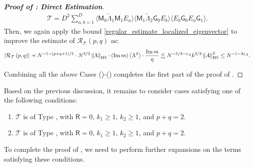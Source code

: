 \documentclass[10pt,reqno]{amsart}
\numberwithin{equation}{section}
\numberwithin{figure}{section}
\newcommand{\rmnum}[1]{\uppercase\expandafter{\romannumeral #1}}
\theoremstyle{plain} %
\theoremstyle{definition} %
\newcommand{\wt}{\widetilde}
\renewcommand{\txt}[1]{\text{\rm{#1}}}
\newcommand{\cT}{\mathcal T}
\newcommand{\cR}{{\mathcal R}}
\newcommand{\sG}{\mathsf G}
\newcommand{\sM}{\mathsf M}
\newcommand{\sR}{\mathsf R}
\renewcommand{\leq}{\le}
\renewcommand{\geq}{\ge}
\newcommand{\pa}[1]{\left({#1}\right)}
\newcommand{\absa}[1]{\left\lvert #1 \right\rvert}
\newcommand{\norma}[1]{\left\lVert #1 \right\rVert}
\newcommand{\avg}[1]{\langle #1 \rangle}
\newcommand{\avga}[1]{\left\langle #1 \right\rangle}
\DeclareMathOperator{\im}{\mathrm{Im}}
\newcommand{\tLambda}{{\wt{\Lambda}}}
\newcommand{\HS}{\txt{HS}}
\newcommand{\dsum}[1]{\sum_{#1=1}^D}
\newcommand{\tl}{\tLambda}
\numberwithin{equation}{section}
\begin{document}
\begin{proof}[\bf Proof of : Direct Estimation]
         \begin{equation}\nonumber
             \begin{aligned}
                 \cT=D^2\dsum{a,b}\avg{\sM_0\tl_1\sM_1 E_a}\avg{\sM_1\tl_2\sG_0 E_b}\avg{E_b\sG_0 E_a \sG_1}.
             \end{aligned}
         \end{equation}
         Then, we again apply the bound \eqref{regular_estimate_localized_eigenvector} to improve the estimate of $\cR_{\cT}\pa{p,q}$ as:
         \begin{equation}\nonumber
             \begin{aligned}
                 \absa{\cR_{\cT}\pa{p,q}}\prec N^{-1-\pa{p+q+1}/2}\cdot N^{3/2}\norma{\Lambda}_{\HS}\cdot (\im m)\avga{\Lambda^2}\cdot \frac{\im m}{\eta}\lesssim N^{-5/3-\varepsilon_A}k^{2/3}\norma{A}_{\HS}^2\leq N^{-1-3\varepsilon_A}.
             \end{aligned}
         \end{equation}

    Combining all the above Cases (\rmnum{1})-(\rmnum{4}) completes the first part of the proof of .
\end{proof}


Based on the previous discussion, it remains to consider cases satisfying one of the following conditions: 
    \begin{enumerate}
        \item $\cT$ is of Type \rmnum{1}, with $\sR=0$, $k_1\geq 1$, $k_2\geq 1$, and $p+q=2$.
        \item $\cT$ is of Type \rmnum{2}, with $\sR=0$, $k_1\geq 1$, $k_2\geq 1$, and $p+q=2$.
    \end{enumerate}
To complete the proof of , we need to perform further expansions on the terms satisfying these conditions.
\end{document}
